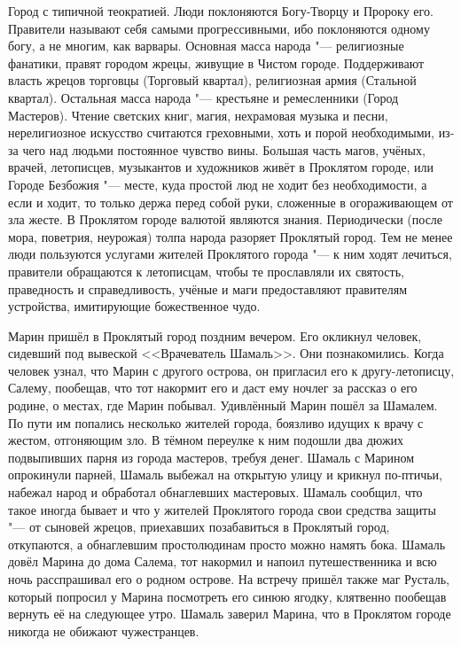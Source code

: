 Город с типичной теократией.
Люди поклоняются Богу-Творцу и Пророку его.
Правители называют себя самыми прогрессивными, ибо поклоняются одному богу, а не многим, как варвары.
Основная масса народа "--- религиозные фанатики, правят городом жрецы, живущие в Чистом городе.
Поддерживают власть жрецов торговцы (Торговый квартал), религиозная армия (Стальной квартал).
Остальная масса народа "--- крестьяне и ремесленники (Город Мастеров).
Чтение светских книг, магия, нехрамовая музыка и песни, нерелигиозное искусство считаются греховными, хоть и порой необходимыми, из-за чего над людьми постоянное чувство вины.
Большая часть магов, учёных, врачей, летописцев, музыкантов и художников живёт в Проклятом городе, или Городе Безбожия "--- месте, куда простой люд не ходит без необходимости, а если и ходит, то только держа перед собой руки, сложенные в огораживающем от зла жесте.
В Проклятом городе валютой являются знания.
Периодически (после мора, поветрия, неурожая) толпа народа разоряет Проклятый город.
Тем не менее люди пользуются услугами жителей Проклятого города "--- к ним ходят лечиться, правители обращаются к летописцам, чтобы те прославляли их святость, праведность и справедливость, учёные и маги предоставляют правителям устройства, имитирующие божественное чудо.

Марин пришёл в Проклятый город поздним вечером.
Его окликнул человек, сидевший под вывеской <<Врачеватель Шамаль>>.
Они познакомились.
Когда человек узнал, что Марин с другого острова, он пригласил его к другу-летописцу, Салему, пообещав, что тот накормит его и даст ему ночлег за рассказ о его родине, о местах, где Марин побывал.
Удивлённый Марин пошёл за Шамалем.
По пути им попались несколько жителей города, боязливо идущих к врачу с жестом, отгоняющим зло.
В тёмном переулке к ним подошли два дюжих подвыпивших парня из города мастеров, требуя денег.
Шамаль с Марином опрокинули парней, Шамаль выбежал на открытую улицу и крикнул по-птичьи, набежал народ и обработал обнаглевших мастеровых.
Шамаль сообщил, что такое иногда бывает и что у жителей Проклятого города свои средства защиты "--- от сыновей жрецов, приехавших позабавиться в Проклятый город, откупаются, а обнаглевшим простолюдинам просто можно намять бока.
Шамаль довёл Марина до дома Салема, тот накормил и напоил путешественника и всю ночь расспрашивал его о родном острове.
На встречу пришёл также маг Русталь, который попросил у Марина посмотреть его синюю ягодку, клятвенно пообещав вернуть её на следующее утро.
Шамаль заверил Марина, что в Проклятом городе никогда не обижают чужестранцев.

